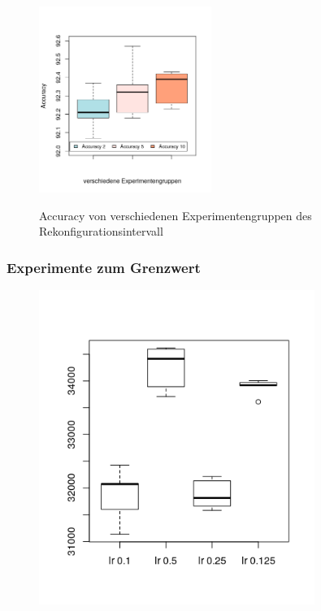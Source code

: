  
 \begin{figure}[h]
 \centering
 \includegraphics[width=0.5\textwidth]{KapitelPartB/Images/reconf3.png}
 \label{abb:reconf3}
 \caption{Accuracy von verschiedenen Experimentengruppen des Rekonfigurationsintervall}
\end{figure}

 \subsubsection{Experimente zum Grenzwert}


\begin{figure}[h]
 \centering
 \includegraphics[width=0.8\textwidth]{KapitelPartB/Images/lr1.png}
 \label{ref:lra}
\end{figure}

